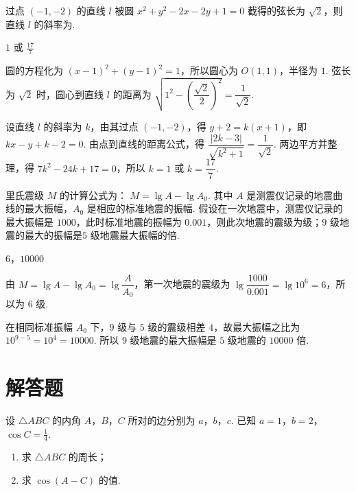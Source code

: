 \begin{problem}
过点 \((-1, -2)\) 的直线 \(l\) 被圆 \(x^{2} + y^{2} - 2x - 2y + 1 = 0\) 截得的弦长为 \(\sqrt{2}\)，则直线 \(l\) 的斜率为\fillinblank{}.
\end{problem}

\begin{answer}
\(1\) 或 \(\frac{17}{7}\)
\end{answer}

\begin{solution}
圆的方程化为 \(\left(x-1\right)^2+\left(y-1\right)^2=1\)，所以圆心为 \(O(1,1)\)，半径为 \(1\). 弦长为 \(\sqrt{2}\) 时，圆心到直线 \(l\) 的距离为
\(\sqrt{1^2-\left(\dfrac{\sqrt{2}}2\right)^2}=\dfrac1{\sqrt{2}}\).

设直线 \(l\) 的斜率为 \(k\)，由其过点 \((-1,-2)\)，得 \(y+2=k(x+1)\)，即 \(kx-y+k-2=0\). 由点到直线的距离公式，得
\(\dfrac{\lvert2k-3\rvert}{\sqrt{k^2+1}}=\dfrac1{\sqrt{2}}\). 两边平方并整理，得
\(7k^2-24k+17=0\)，所以 \(k=1\) 或 \(k=\dfrac{17}{7}\).
\end{solution}

\begin{problem}
里氏震级 \(M\) 的计算公式为： \(M = \lg A - \lg A_0\). 其中 \(A\) 是测震仪记录的地震曲线的最大振幅，\(A_0\) 是相应的标准地震的振幅. 假设在一次地震中，测震仪记录的最大振幅是 \(1000\)，此时标准地震的振幅为 \(0.001\)，则此次地震的震级为\fillinblank{}\(\text{级}\)；\(9\text{ 级}\)地震的最大的振幅是\(5\text{ 级}\)地震最大振幅的\fillinblank{}\(\text{倍}\).
\end{problem}

\begin{answer}
\(6\)，\(10000\)
\end{answer}

\begin{solution}
由 \(M=\lg A-\lg A_0=\lg\dfrac{A}{A_0}\)，第一次地震的震级为
\(\lg\dfrac{1000}{0.001}=\lg10^6=6\)，所以为 \(6\) 级.

在相同标准振幅 \(A_0\) 下，\(9\) 级与 \(5\) 级的震级相差 \(4\)，故最大振幅之比为
\(10^{9-5}=10^4=10000\). 所以 \(9\) 级地震的最大振幅是 \(5\) 级地震的 \(10000\) 倍.
\end{solution}

\section{解答题}

\begin{problem}
设 \(\triangle ABC\) 的内角 \(A\)，\(B\)，\(C\) 所对的边分别为 \(a\)，\(b\)，\(c\). 已知 \(a = 1\)，\(b = 2\)，\(\cos C = \frac{1}{4}\).
\begin{enumerate}
\item 求 \( \triangle ABC \) 的周长；
\item 求 \( \cos(A-C) \) 的值.
\end{enumerate}
\end{problem}

